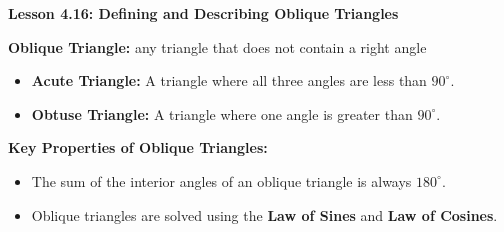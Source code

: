 \begin{center}
\textbf{Lesson 4.16: Defining and Describing Oblique Triangles}
\end{center}

\vspace*{-1.5ex}

\noindent \textbf{Oblique Triangle:} any triangle that does not contain a right angle

    \begin{itemize}
        \item \textbf{Acute Triangle:} A triangle where all three angles are less than \(90^\circ\).  
        \item \textbf{Obtuse Triangle:} A triangle where one angle is greater than \(90^\circ\).  
    \end{itemize}

\noindent \textbf{Key Properties of Oblique Triangles:}
    \begin{itemize}
        \item The sum of the interior angles of an oblique triangle is always \(180^\circ\).
        \item Oblique triangles are solved using the \textbf{Law of Sines} and \textbf{Law of Cosines}.
    \end{itemize}
